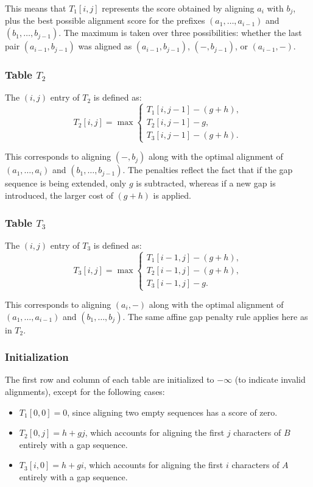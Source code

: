 \documentclass[12pt]{book}
\begin{document}
This means that $T_1[i,j]$ represents the score obtained by aligning $a_i$ with $b_j$, plus the best possible alignment score for the prefixes $(a_1,\ldots,a_{i-1})$ and $(b_1,\ldots,b_{j-1})$. The maximum is taken over three possibilities: whether the last pair $(a_{i-1},b_{j-1})$ was aligned as $(a_{i-1},b_{j-1})$, $( -,b_{j-1})$, or $(a_{i-1},-)$.

\subsubsection{Table $T_2$}
The $(i,j)$ entry of $T_2$ is defined as:
\[
T_2[i,j] = \max
\begin{cases}
    T_1[i,j-1] - (g+h), \\
    T_2[i,j-1] - g, \\
    T_3[i,j-1] - (g+h).
\end{cases}
\]

This corresponds to aligning $(-, b_j)$ along with the optimal alignment of $(a_1,\ldots,a_i)$ and $(b_1,\ldots,b_{j-1})$. The penalties reflect the fact that if the gap sequence is being extended, only $g$ is subtracted, whereas if a new gap is introduced, the larger cost of $(g+h)$ is applied.

\subsubsection{Table $T_3$}
The $(i,j)$ entry of $T_3$ is defined as:
\[
T_3[i,j] = \max
\begin{cases}
    T_1[i-1,j] - (g+h), \\
    T_2[i-1,j] - (g+h), \\
    T_3[i-1,j] - g.
\end{cases}
\]

This corresponds to aligning $(a_i, -)$ along with the optimal alignment of $(a_1,\ldots,a_{i-1})$ and $(b_1,\ldots,b_j)$. The same affine gap penalty rule applies here as in $T_2$.

\subsubsection{Initialization}
The first row and column of each table are initialized to $-\infty$ (to indicate invalid alignments), except for the following cases:
\begin{itemize}
    \item $T_1[0,0] = 0$, since aligning two empty sequences has a score of zero.
    \item $T_2[0,j] = h + gj$, which accounts for aligning the first $j$ characters of $B$ entirely with a gap sequence.
    \item $T_3[i,0] = h + gi$, which accounts for aligning the first $i$ characters of $A$ entirely with a gap sequence.
\end{itemize}
\end{document}
